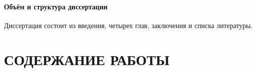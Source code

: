 \paragraph{Объём и структура диссертации}
Диссертация состоит из введения, четырех глав, заключения и списка литературы.

\section*{СОДЕРЖАНИЕ РАБОТЫ}





%




\newpage
